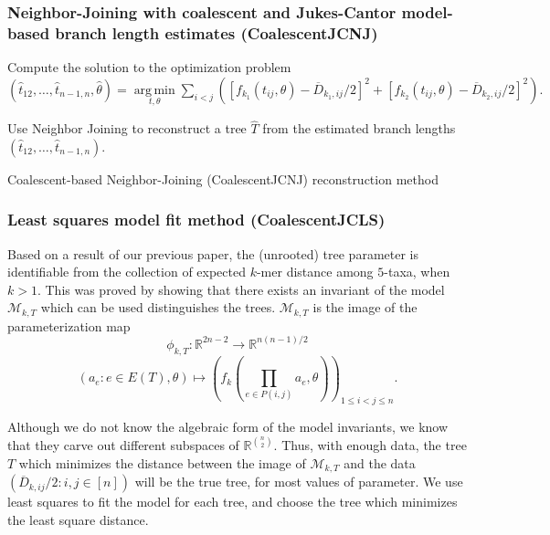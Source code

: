 \documentclass[12pt]{article}
\newcommand{\R}{\mathbb{R}}
\newcommand{\rr}{\mathbb{R}}
\newcommand{\calm}{\mathcal{M}}
\theoremstyle{definition}
\begin{document}
\subsubsection{Neighbor-Joining with coalescent and Jukes-Cantor model-based branch length estimates (CoalescentJCNJ)}
\begin{algorithm}[H]
            Compute the solution to the optimization problem $(\hat{t}_{12}, \ldots, \hat{t}_{n-1,n},\hat{\theta}) 
            = \operatorname*{arg\,min}\limits_{t,\theta} \sum_{i<j} \left([f_{k_1}(t_{ij},\theta)- \overline{D}_{k_1,ij}/2]^2 + [f_{k_2}(t_{ij},\theta) -\overline{D}_{k_2,ij}/2]^2\right).$\;

            Use Neighbor Joining to reconstruct a tree $\hat{T}$ from the estimated branch lengths $(\hat{t}_{12}, \ldots, \hat{t}_{n-1,n})$.\;
 \caption{Coalescent-based Neighbor-Joining (CoalescentJCNJ) reconstruction method}
 \label{algorithm:NJcoalescent}
\end{algorithm}

\subsubsection{Least squares model fit method (CoalescentJCLS)}

Based on a result of our previous paper, the (unrooted) tree parameter is identifiable from the collection of expected $k$-mer distance among $5$-taxa, when $k>1$. This was proved by showing that there exists an invariant of the model $\calm_{k,T}$ which can be used distinguishes the trees. $\calm_{k,T}$ is the image of the parameterization map
\[
\phi_{k,T}  :  \rr^{2n -2}  \rightarrow   \rr^{n(n-1)/2}
\]
\[
(a_e : e \in E(T),  \theta)  \mapsto    \left(f_k\left( \prod_{e \in P(i,j)} a_e,  \theta\right)\right)_{1 \leq i < j \leq n}.
\]

Although we do not know the algebraic form of the model invariants, we know that they carve out different subspaces of $\R^{n \choose 2}$. Thus, with enough data, the tree $T$ which minimizes the distance between the image of $\calm_{k,T}$ and the data $(\overline{D}_{k,ij}/2 : i,j \in [n])$ will be the true tree, for most values of parameter. We use least squares to fit the model for each tree, and choose the tree which minimizes the least square distance.
\end{document}
